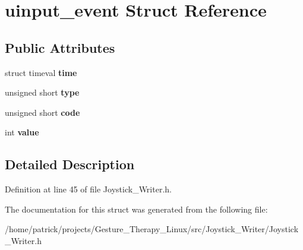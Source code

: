 \hypertarget{structuinput__event}{}\section{uinput\+\_\+event Struct Reference}
\label{structuinput__event}
\subsection*{Public Attributes}
\begin{DoxyCompactItemize}
\item 
\mbox{\label{structuinput__event_ae4282782ec7159f07b3ecec64a2fd4b2}} 
struct timeval {\bfseries time}
\item 
\mbox{\label{structuinput__event_a3042174c0b4572da8aab5d8de2e4ce90}} 
unsigned short {\bfseries type}
\item 
\mbox{\label{structuinput__event_a04cfd9b357019858d2ed432c73d14481}} 
unsigned short {\bfseries code}
\item 
\mbox{\label{structuinput__event_ac3ec667a4c321cccb194773251d99ec4}} 
int {\bfseries value}
\end{DoxyCompactItemize}


\subsection{Detailed Description}


Definition at line 45 of file Joystick\+\_\+\+Writer.\+h.



The documentation for this struct was generated from the following file\+:\begin{DoxyCompactItemize}
\item 
/home/patrick/projects/\+Gesture\+\_\+\+Therapy\+\_\+\+Linux/src/\+Joystick\+\_\+\+Writer/Joystick\+\_\+\+Writer.\+h\end{DoxyCompactItemize}
